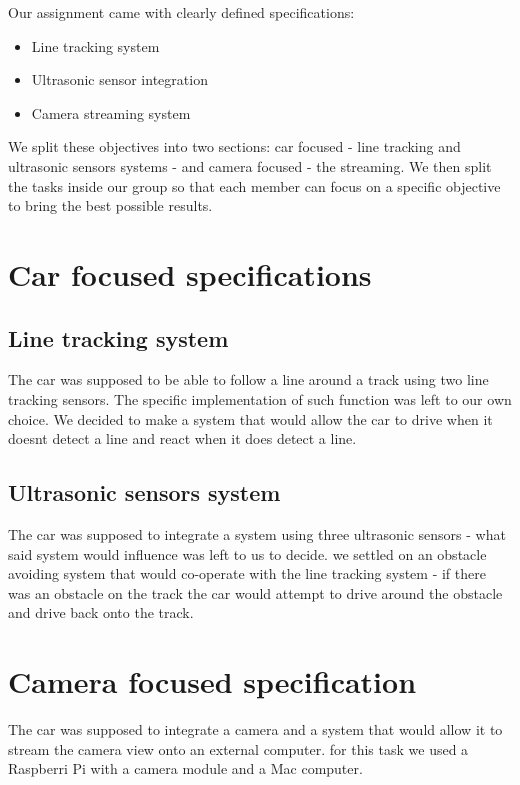 \documentclass[conference]{IEEEtran}
\begin{document}
Our assignment came with clearly defined specifications:
\begin{itemize}
\item Line tracking system
\item Ultrasonic sensor integration
\item Camera streaming system
\end{itemize}
We split these objectives into two sections: car focused - line tracking and ultrasonic sensors systems - and camera focused - the streaming.
We then split the tasks inside our group so that each member can focus on a specific objective to bring the best possible results.


\section{Car focused specifications}
\subsection{Line tracking system}
The car was supposed to be able to follow a line around a track using two line tracking sensors. The specific implementation of such function was left to our own choice.
We decided to make a system that would allow the car to drive when it doesnt detect a line and react when it does detect a line.

\subsection{Ultrasonic sensors system}
The car was supposed to integrate a system using three ultrasonic sensors - what said system would influence was left to us to decide.
we settled on an obstacle avoiding system that would co-operate with the line tracking system - if there was an obstacle on the track the car
would attempt to drive around the obstacle and drive back onto the track.

\section{Camera focused specification}
The car was supposed to integrate a camera and a system that would allow it to stream the camera view onto an external computer.
for this task we used a Raspberri Pi with a camera module and a Mac computer.
\end{document}
